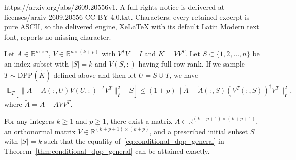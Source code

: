 \documentclass[10pt,a4paper]{amsart}
\newcommand{\Rmn}{\mathbb{R}^{m\times n}}
\newcommand{\R}{\mathbb{R}}
\newcommand{\be}{\begin{eqnarray}}
\newcommand{\ee}{\end{eqnarray}}
\begin{document}
https://arxiv.org/abs/2609.20556v1. A full rights notice is delivered at licenses/arxiv-2609.20556-CC-BY-4.0.txt. Characters: every retained excerpt is pure ASCII, so the delivered engine, XeLaTeX with its default Latin Modern text font, reports no missing character.
\begin{theorem}
\label{thm:conditional_dpp_general}
    Let $A\in \Rmn$, $V \in \R^{n\times (k+p)} $ with $V^TV = I$ and $K = VV^T$. Let $S\subset \{1,2,\dots,n\}$ be an index subset with $|S| = k$ and $V(S,:)$ having  full row rank. If we sample $T\sim \mathrm{DPP}(\widetilde K)$ defined above and then let $U = S\cup T$, we have
    \be
    \label{eq:conditional_dpp_general}
    \mathbb{E}_T [ \|A - A(:,U)V(U,:)^{-T}V^T\|_F^2\mid S ] \leq (1 + p) \|\widetilde{A} -  \widetilde{A}(:,S)(V^T(:,S))^{\dagger} V^T\|_F^2,
    \ee
    where $\widetilde A = A - AVV^T$.
\end{theorem}

\begin{theorem}
\label{thm:conditional-sharpness}
For any integers $k\geq 1$ and $p\geq 1$, there exist a matrix
$A\in\mathbb{R}^{(k+p+1)\times(k+p+1)}$, an orthonormal matrix
$V\in\mathbb{R}^{(k+p+1)\times(k+p)}$, and a prescribed initial
subset $S$ with $|S|=k$ such that the equality of~\eqref{eq:conditional_dpp_general} in
Theorem~\ref{thm:conditional_dpp_general} can be attained exactly.
\end{theorem}
\end{document}
